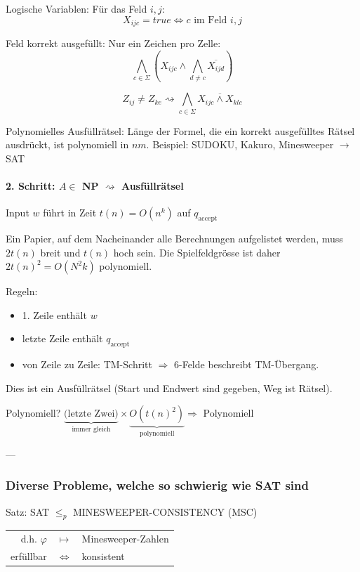 Logische Variablen: Für das Feld $i,j$: \[
	X_{ijc} = true \Leftrightarrow c \text{ im Feld } i,j
\]

Feld korrekt ausgefüllt: Nur ein Zeichen pro Zelle: \[
	\bigwedge_{c \in \Sigma} \left( X_{ijc} \land \bigwedge_{d \neq c} \overline{X_{ijd}} \right)
\]

\[
	Z_{ij} \neq Z_{ke} \rightsquigarrow \bigwedge_{c \in \Sigma} \overline{X_{ijc} \land X_{klc}}
\]

Polynomielles Ausfüllrätsel: Länge der Formel, die ein korrekt ausgefülltes Rätsel ausdrückt, ist polynomiell in $nm$. Beispiel: SUDOKU, Kakuro, Minesweeper $\longrightarrow$ SAT

\paragraph{2. Schritt: $A \in $ NP $\rightsquigarrow$ Ausfüllrätsel}

Input $w$ führt in Zeit $t(n) = O(n^k)$ auf $q_\text{accept}$


Ein Papier, auf dem Nacheinander alle Berechnungen aufgelistet werden, muss $2t(n)$ breit und $t(n)$ hoch sein.
Die Spielfeldgrösse ist daher $2t(n)^2 = O(N^2k)$ polynomiell.

Regeln: \begin{itemize}
		\item 1. Zeile enthält $w$
		\item letzte Zeile enthält $q_\text{accept}$
		\item von Zeile zu Zeile: TM-Schritt $\Rightarrow$ 6-Felde beschreibt TM-Übergang.
	\end{itemize}
Dies ist ein Ausfüllrätsel (Start und Endwert sind gegeben, Weg ist Rätsel).

Polynomiell? $\underbrace{\text{(letzte Zwei)}}_{\text{immer gleich}} \times \underbrace{O(t(n)^2)}_{\text{polynomiell}} \Rightarrow$ Polynomiell

\----

\subsubsection{Diverse Probleme, welche so schwierig wie SAT sind}

Satz: SAT $\leq_p$ MINESWEEPER-CONSISTENCY (MSC)

\begin{tabu}{r c l}
	d.h. $\varphi$ &$\longmapsto$& Minesweeper-Zahlen \\
	erfüllbar & $\Leftrightarrow$& konsistent
	\end{tabu}

